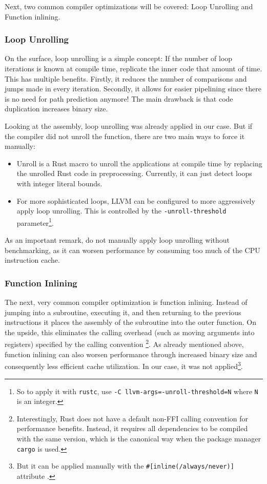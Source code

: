 Next, two common compiler optimizations will be covered: Loop Unrolling and Function inlining.

\subsubsection{Loop Unrolling}

On the surface, loop unrolling is a simple concept: If the number of loop iterations is known at compile time, replicate the inner code that amount of time. This has multiple benefits. Firstly, it reduces the number of comparisons and jumps made in every iteration. Secondly, it allows for easier pipelining since there is no need for path prediction anymore! The main drawback is that code duplication increases binary size.

Looking at the assembly, loop unrolling was already applied in our case. But if the compiler did not unroll the function, there are two main ways to force it manually:
\begin{itemize}
  \item Unroll \cite{unroll} is a Rust macro to unroll the applications at compile time by replacing the unrolled Rust code in preprocessing. Currently, it can just detect loops with integer literal bounds.
  \item For more sophisticated loops, LLVM can be configured to more aggressively apply loop unrolling. This is controlled by the \texttt{-unroll-threshold} parameter\footnote{So to apply it with \texttt{rustc}, use \texttt{-C llvm-args=-unroll-threshold=N} where \texttt{N} is an integer.}.
\end{itemize}
As an important remark, do not manually apply loop unrolling without benchmarking, as it can worsen performance by consuming too much of the CPU instruction cache.

\subsubsection{Function Inlining}

The next, very common compiler optimization is function inlining. Instead of jumping into a subroutine, executing it, and then returning to the previous instructions it places the assembly of the subroutine into the outer function. On the upside, this eliminates the calling overhead (such as moving arguments into registers) specified by the calling convention \footnote{Interestingly, Rust does not have a default non-FFI calling convention for performance benefits. Instead, it requires all dependencies to be compiled with the same version, which is the canonical way when the package manager \texttt{cargo} is used.}. As already mentioned above, function inlining can also worsen performance through increased binary size and consequently less efficient cache utilization. In our case, it was not applied\footnote{But it can be applied manually with the \texttt{\#[inline(/always/never)]} attribute \cite{inline}.}.\\

